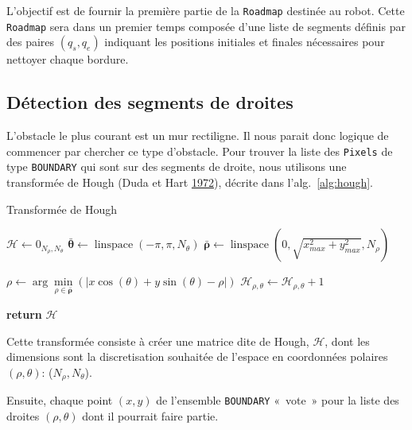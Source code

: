 \documentclass[french,A4paper,]{book}
\begin{document}
L'objectif est de fournir la première partie de la \texttt{Roadmap}
destinée au robot. Cette \texttt{Roadmap} sera dans un premier temps
composée d'une liste de segments définis par des paires \((q_s, q_e)\)
indiquant les positions initiales et finales nécessaires pour nettoyer
chaque bordure.

\subsection{Détection des segments de
droites}\label{sec:borduresdroites}

L'obstacle le plus courant est un mur rectiligne. Il nous parait donc
logique de commencer par chercher ce type d'obstacle. Pour trouver la
liste des \texttt{Pixels} de type \texttt{BOUNDARY} qui sont sur des
segments de droite, nous utilisons une transformée de Hough (Duda et
Hart \protect\hyperlink{ref-hough}{1972}), décrite dans
l'alg.~\ref{alg:hough}.

\begin{algorithm}
\caption{Transformée de Hough}
\label{alg:hough}
\begin{algorithmic}[1]


\State $\mathcal{H} \gets 0_{N_\rho, N_\theta}$
\State $\bm{\bar\theta} \gets \operatorname{linspace}(-\pi, \pi, N_\theta)$
\State $\bm{\bar\rho} \gets \operatorname{linspace}(0, \sqrt{x_{max}^2+y_{max}^2}, N_\rho)$

\For{$\theta \in \bm{\bar\theta}$}
\State $\rho \gets \arg\min\limits_{\rho \in \bm{\bar\rho}}(|x \cos(\theta) + y \sin(\theta) - \rho|)$
\State $\mathcal{H}_{\rho,\theta} \gets \mathcal{H}_{\rho,\theta} + 1$
\EndFor
\EndFor

\State \textbf{return} $\mathcal{H}$
\EndProcedure

\end{algorithmic}
\end{algorithm}

Cette transformée consiste à créer une matrice dite de Hough,
\(\mathcal{H}\), dont les dimensions sont la discretisation souhaitée de
l'espace en coordonnées polaires \((\rho, \theta)\):
(\(N_\rho, N_\theta\)).

Ensuite, chaque point \((x, y)\) de l'ensemble \texttt{BOUNDARY}
«~vote~» pour la liste des droites \((\rho, \theta)\) dont il pourrait
faire partie.
\end{document}
